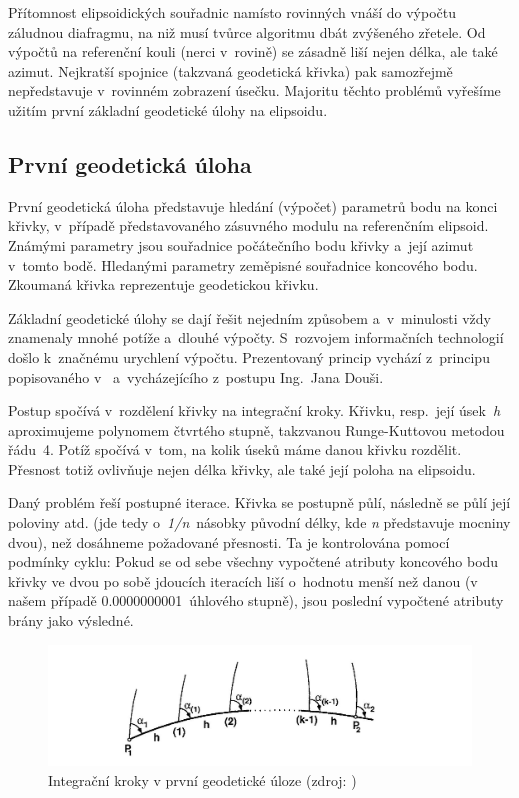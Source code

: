 Přítomnost elipsoidických souřadnic namísto rovinných vnáší do výpočtu záludnou diafragmu, na niž musí
tvůrce algoritmu dbát zvýšeného zřetele. Od výpočtů na referenční kouli (nerci v~rovině) se
zásadně liší nejen délka, ale také azimut. Nejkratší spojnice (takzvaná geodetická křivka) pak samozřejmě
nepředstavuje v~rovinném zobrazení úsečku. Majoritu těchto problémů vyřešíme užitím první základní
geodetické úlohy na elipsoidu. 

\subsection{První geodetická úloha}
\label{prvnigu}

První geodetická úloha představuje hledání (výpočet) parametrů bodu na konci křivky, v~případě
představovaného zásuvného modulu na referenčním elipsoid. Zná\-mými parametry jsou souřadnice počátečního
bodu křivky a~její azimut v~tomto bodě. Hledanými parametry zeměpisné souřadnice koncového bodu.
Zkoumaná křivka reprezentuje geodetickou křivku. 

Základní geodetické úlohy se dají řešit nejedním způsobem a~v~minulosti vždy znamenaly mnohé potíže
a~dlouhé výpočty. S~rozvojem informačních technologií došlo k~značnému urychlení výpočtu.
Prezentovaný princip vychází z~principu popisovaného v~\cite{vyssigeodezie} a~vycházejícího
z~postupu Ing.~Jana Douši. 

Postup spočívá v~rozdělení křivky na integrační kroky. Křivku, resp.~její úsek~\textit{h}
aproximujeme polynomem čtvrtého stupně, takzvanou Runge-Kuttovou metodou řádu~4. Potíž spočívá v~tom,
na kolik úseků máme danou křivku rozdělit. Přesnost totiž ovlivňuje nejen délka křivky, ale také její
poloha na elipsoidu. 

Daný problém řeší postupné iterace. Křivka se postupně půlí, následně se půlí její poloviny atd. (jde
tedy o~\textit{1/n}~násobky původní délky, kde \textit{n} představuje mocniny dvou), než dosáhneme
požadované přesnosti. Ta je kontrolována pomocí podmínky cyklu: Pokud se od sebe všechny vypočtené
atributy koncového bodu křivky ve dvou po sobě jdoucích iteracích liší o~hodnotu menší než danou
(v našem případě 0.0000000001~úhlového stupně), jsou poslední vypočtené atributy brány jako výsledné. 


  \begin{figure}[H]
   \centering
	\includegraphics[scale=0.4]{./pictures/prvnigu-integrace.png}
	\caption[Integrační kroky v první geodetické úloze]{Integrační kroky v první geodetické úloze
	(zdroj: \cite{vyssigeodezie})}
      \label{fig:prvnigu-integrace}
  \end{figure}





